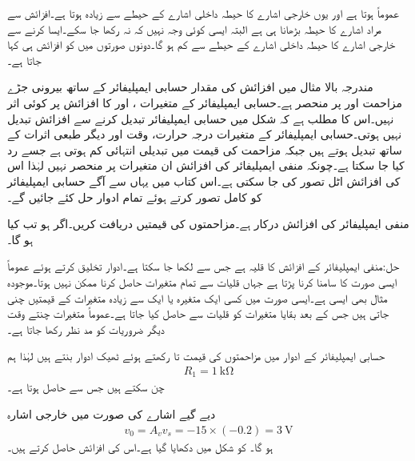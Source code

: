 عموماً  ہوتا ہے اور یوں خارجی اشارے کا حیطہ داخلی اشارے کے حیطے سے زیادہ ہوتا ہے۔افزائش سے مراد اشارے کا حیطہ بڑھانا ہی ہے البتہ ایسی کوئی وجہ نہیں کہ  نہ رکھا جا سکے۔ایسا کرنے سے خارجی اشارے کا حیطہ داخلی اشارے کے حیطے سے کم ہو گا۔دونوں صورتوں میں  کو افزائش ہی کہا جاتا ہے۔

مندرجہ بالا مثال میں افزائش  کی مقدار حسابی ایمپلیفائر کے ساتھ بیرونی جڑے مزاحمت  اور  پر منحصر ہے۔حسابی ایمپلیفائر کے  متغیرات ،  اور  کا افزائش پر کوئی اثر نہیں۔اس کا مطلب ہے کہ شکل  میں حسابی ایمپلیفائر تبدیل کرنے سے افزائش تبدیل نہیں ہوتی۔حسابی ایمپلیفائر کے متغیرات درجہ حرارت، وقت اور دیگر طبعی اثرات کے ساتھ تبدیل ہوتے ہیں جبکہ مزاحمت کی قیمت میں تبدیلی انتہائی کم ہوتی ہے جسے رد کیا جا سکتا ہے۔چونکہ منفی ایمپلیفائر کی افزائش ان متغیرات پر منحصر نہیں لہٰذا اس کی افزائش اٹل تصور کی جا سکتی ہے۔اس کتاب میں یہاں سے آگے حسابی ایمپلیفائر کو کامل تصور کرتے ہوئے تمام ادوار حل کئے جائیں گے۔

منفی ایمپلیفائر کی افزائش  درکار ہے۔مزاحمتوں کی قیمتیں دریافت کریں۔اگر  ہو تب  کیا ہو گا۔

حل:منفی ایمپلیفائر کے افزائش کا قلیہ  ہے  جس سے  لکھا جا سکتا ہے۔ادوار تخلیق کرتے ہوئے عموماً ایسی صورت کا سامنا کرنا پڑتا ہے جہاں قلیات سے تمام متغیرات حاصل کرنا ممکن نہیں ہوتا۔موجودہ مثال  بھی ایسی ہے۔ایسی صورت میں کسی ایک متغیرہ یا ایک سے زیادہ  متغیرات کے قیمتیں چنی جاتی ہیں جس کے بعد بقایا متغیرات کو قلیات سے حاصل کیا جاتا ہے۔عموماً متغیرات چنتے وقت دیگر ضروریات کو مد نظر رکھا جاتا ہے۔

حسابی ایمپلیفائر کے ادوار میں مزاحمتوں کی قیمت  تا  رکھتے ہوئے ٹھیک ادوار بنتے ہیں لہٰذا ہم
\begin{align*}
R_1=\SI{1}{\kilo\ohm}
\end{align*}
چن سکتے ہیں جس سے  حاصل ہوتا ہے۔

دیے گیے اشارے کی صورت میں خارجی اشارہ
\begin{align*}
v_0=A_v v_s = -15 \times (-0.2)=\SI{3}{\volt}
\end{align*}
ہو گا۔
 کو شکل  میں دکھایا گیا ہے۔اس کی افزائش  حاصل کرتے ہیں۔


